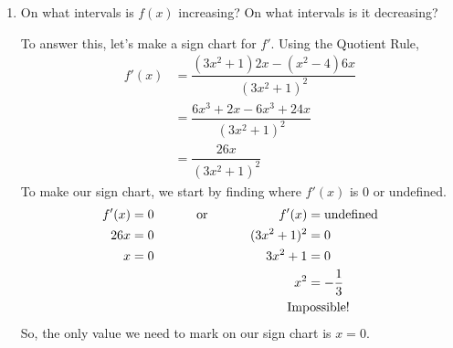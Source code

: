 \documentclass{article}
\theoremstyle{theorem}
\begin{document}
\begin{enumerate}
\begin{enumerate}
\begin{solution}
      Let's evaluate $\displaystyle \lim_{x \to \infty} f(x)$ first. As $x \to \infty$, both the numerator and denominator have a term that $\to \infty$. As we've seen, in a sum where some terms go to $\pm \infty$, we only need to keep the fastest-growing term.\footnote{Why does this work? In the sum $x^2 - 4$, when $x$ gets very big, the $-4$ is tiny compared to $x^2$, so $x^2 - 4 \approx x^2$ when $x$ is very big. Similarly, when $x$ is very big, $3x^2 + 1 \approx 3x^2$.} So, \[ \lim_{x \to \infty} \frac{x^2 - 4}{3x^2 + 1} = \lim_{x \to \infty} \frac{x^2}{3x^2} = \lim_{x \to \infty} \frac{1}{3} = \frac{1}{3}.\]
      Similarly,
      \[ \lim_{x \to -\infty} \frac{x^2 - 4}{3x^2 + 1} = \lim_{x \to -\infty} \frac{x^2}{3x^2} = \lim_{x \to -\infty} \frac{1}{3} = \frac{1}{3}.\]
      So, the only horizontal asymptote is $\boxed{y = \frac{1}{3}}$. 
    \end{solution}

  \item
    \begin{problem}[\vfill]
      On what intervals is $f(x)$ increasing? On what intervals is it decreasing?
    \end{problem}

    \begin{solution}
      To answer this, let's make a sign chart for $f'$. Using the Quotient Rule,
      \begin{align*}
        f'(x) &= \dfrac{(3x^2 + 1) 2x - (x^2 - 4)6x}{(3x^2 + 1)^2} \\
        &= \dfrac{6x^3 + 2x - 6x^3 + 24x}{(3x^2 + 1)^2} \\
        &= \dfrac{26 x}{(3x^2 + 1)^2}
      \end{align*}
      To make our sign chart, we start by finding where $f'(x)$ is 0 or undefined.
      \begin{alignat*}{4}
        f'(x) &= 0 & \qquad \text{ or } \qquad && f'(x) &= \text{undefined} \\
        26x &= 0 & && (3x^2 + 1)^2 &= 0 \\
        x &= 0 &&& 3x^2 + 1 &= 0 \\
        &&&& x^2 &= - \frac{1}{3} \\        
        & &&& \multispan3{\hspace{0.4in}Impossible!}
      \end{alignat*}
      So, the only value we need to mark on our sign chart is $x = 0$.


\end{solution}
\end{enumerate}
\end{enumerate}
\end{document}

